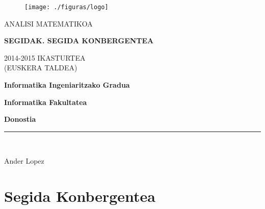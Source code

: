 


\begin{titlepage}

\begin{center}
\vspace*{-1in}
\begin{figure}[htb]
\begin{center}
\texttt{[image: ./figuras/logo]}
\end{center}
\end{figure}


ANALISI MATEMATIKOA\\
\vspace*{1.15in}
\begin{Huge}
\textbf{SEGIDAK. SEGIDA KONBERGENTEA}\\
\end{Huge}
\vspace*{0.6in}
\begin{large}
2014-2015 IKASTURTEA\\
\vspace*{0.15in}
(EUSKERA TALDEA)\\
\end{large}
\vspace*{1.2in}
\begin{Large}
\textbf{Informatika Ingeniaritzako Gradua} \\
\end{Large}
\begin{Large}
\textbf{Informatika Fakultatea} \\
\end{Large}
\begin{Large}
\textbf{Donostia} \\
\end{Large}
\vspace*{2.3in}
\vspace*{0.3in}
\rule{80mm}{0.1mm}\\
\vspace*{0.1in}
\begin{large}
Ander Lopez \\
\end{large}
\end{center}

\end{titlepage}


\section{Segida Konbergentea}

